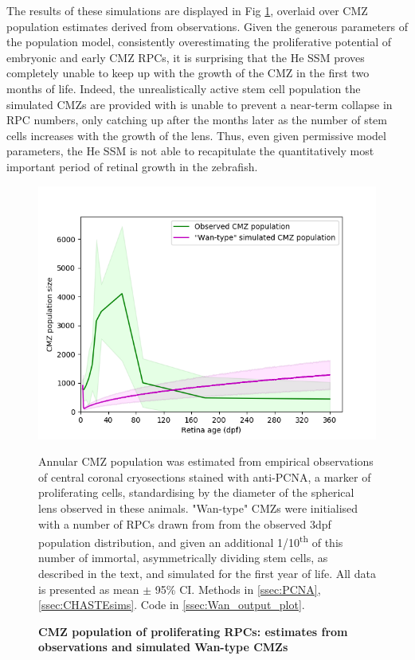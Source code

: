\documentclass{ut-thesis}
\begin{document}
\begin{NoHyper}
The results of these simulations are displayed in Fig \ref{WanSim}, overlaid over CMZ population estimates derived from observations. Given the generous parameters of the population model, consistently overestimating the proliferative potential of embryonic and early CMZ RPCs, it is surprising that the He SSM proves completely unable to keep up with the growth of the CMZ in the first two months of life. Indeed, the unrealistically active stem cell population the simulated CMZs are provided with is unable to prevent a near-term collapse in RPC numbers, only catching up after the months later as the number of stem cells increases with the growth of the lens. Thus, even given permissive model parameters, the He SSM is not able to recapitulate the quantitatively most important period of retinal growth in the zebrafish.

\begin{figure}[!h]
\includegraphics{ssm/Fig_7_wan.png}   
\caption{{\bf CMZ population of proliferating RPCs: estimates from observations and simulated Wan-type CMZs}}
Annular CMZ population was estimated from empirical observations of central coronal cryosections stained with anti-PCNA, a marker of proliferating cells, standardising by the diameter of the spherical lens observed in these animals. "Wan-type" CMZs were initialised with a number of RPCs drawn from from the observed 3dpf population distribution, and given an additional 1/10\textsuperscript{th} of this number of immortal, asymmetrically dividing stem cells, as described in the text, and simulated for the first year of life. All data is presented as mean $\pm$ 95\% CI.
Methods in \autoref{ssec:PCNA}, \autoref{ssec:CHASTEsims}.
Code in \autoref{ssec:Wan_output_plot}.
\label{WanSim}
\end{figure}


\end{NoHyper}
\end{document}

